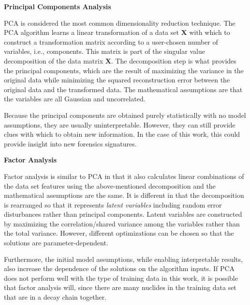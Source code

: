 
\vspace{5mm} \noindent \textbf{Principal Components Analysis} \vspace{5mm}

\Gls{PCA} is considered the most common dimensionality reduction technique.
The \gls{PCA} algorithm learns a linear transformation of a data set
$\boldsymbol{X}$ with which to construct a transformation matrix according to a
user-chosen number of variables, i.e., components.  This matrix is part of the
singular value decomposition of the data matrix $\boldsymbol{X}$.  The
decomposition step is what provides the principal components, which are the
result of maximizing the variance in the original data while minimizing the
squared reconstruction error between the original data and the transformed
data. The mathematical assumptions are that the variables are all Gaussian and
uncorrelated.

Because the principal components are obtained purely statistically with no
model assumptions, they are usually uninterpretable. However, they can still
provide clues with which to obtain new information. In the case of this work,
this could provide insight into new forensics signatures.

\vspace{5mm} \noindent \textbf{Factor Analysis} \vspace{5mm}

Factor analysis is similar to \gls{PCA} in that it also calculates linear
combinations of the data set features using the above-mentioned decomposition
and the mathematical assumptions are the same.  It is different in that the
decomposition is rearranged so that it represents \textit{latent variables}
including random error disturbances rather than principal components.  Latent
variables are constructed by maximizing the correlation/shared variance among
the variables rather than the total variance.  However, different optimizations
can be chosen so that the solutions are parameter-dependent.  

Furthermore, the initial model assumptions, while enabling interpretable
results, also increase the dependence of the solutions on the algorithm inputs.
If \gls{PCA} does not perform well with the type of training data in this work,
it is possible that factor analysis will, since there are many nuclides in the
training data set that are in a decay chain together.

